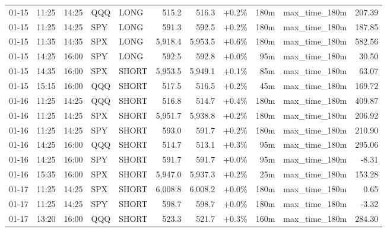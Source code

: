 \documentclass[11pt,a4paper,twoside]{article}
\begin{document}
\begin{center}
\begin{longtable}{>{\color{txtmain}}l l l l l r r r r >{\color{txtmain}}l r}
01-15 & 11:25 & 14:25 & QQQ & LONG & 515.2 & 516.3 & \textcolor{wingreen}{+0.2\%} & 180m & max\_time\_180m & \textcolor{wingreen}{207.39} \\
01-15 & 11:25 & 14:25 & SPY & LONG & 591.3 & 592.5 & \textcolor{wingreen}{+0.2\%} & 180m & max\_time\_180m & \textcolor{wingreen}{187.85} \\
01-15 & 11:35 & 14:35 & SPX & LONG & 5,918.4 & 5,953.5 & \textcolor{wingreen}{+0.6\%} & 180m & max\_time\_180m & \textcolor{wingreen}{582.56} \\
01-15 & 14:25 & 16:00 & SPY & LONG & 592.5 & 592.8 & \textcolor{wingreen}{+0.0\%} & 95m & max\_time\_180m & \textcolor{wingreen}{30.50} \\
01-15 & 14:35 & 16:00 & SPX & SHORT & 5,953.5 & 5,949.1 & \textcolor{wingreen}{+0.1\%} & 85m & max\_time\_180m & \textcolor{wingreen}{63.07} \\
01-15 & 15:15 & 16:00 & QQQ & SHORT & 517.5 & 516.5 & \textcolor{wingreen}{+0.2\%} & 45m & max\_time\_180m & \textcolor{wingreen}{169.72} \\
01-16 & 11:25 & 14:25 & QQQ & SHORT & 516.8 & 514.7 & \textcolor{wingreen}{+0.4\%} & 180m & max\_time\_180m & \textcolor{wingreen}{409.87} \\
01-16 & 11:25 & 14:25 & SPX & SHORT & 5,951.7 & 5,938.8 & \textcolor{wingreen}{+0.2\%} & 180m & max\_time\_180m & \textcolor{wingreen}{206.92} \\
01-16 & 11:25 & 14:25 & SPY & SHORT & 593.0 & 591.7 & \textcolor{wingreen}{+0.2\%} & 180m & max\_time\_180m & \textcolor{wingreen}{210.90} \\
01-16 & 14:25 & 16:00 & QQQ & SHORT & 514.7 & 513.1 & \textcolor{wingreen}{+0.3\%} & 95m & max\_time\_180m & \textcolor{wingreen}{295.06} \\
01-16 & 14:25 & 16:00 & SPY & SHORT & 591.7 & 591.7 & \textcolor{wingreen}{+0.0\%} & 95m & max\_time\_180m & \textcolor{lossred}{-8.31} \\
01-16 & 15:35 & 16:00 & SPX & SHORT & 5,947.0 & 5,937.3 & \textcolor{wingreen}{+0.2\%} & 25m & max\_time\_180m & \textcolor{wingreen}{153.28} \\
01-17 & 11:25 & 14:25 & SPX & SHORT & 6,008.8 & 6,008.2 & \textcolor{wingreen}{+0.0\%} & 180m & max\_time\_180m & \textcolor{wingreen}{0.65} \\
01-17 & 11:25 & 14:25 & SPY & SHORT & 598.7 & 598.7 & \textcolor{wingreen}{+0.0\%} & 180m & max\_time\_180m & \textcolor{lossred}{-3.32} \\
01-17 & 13:20 & 16:00 & QQQ & SHORT & 523.3 & 521.7 & \textcolor{wingreen}{+0.3\%} & 160m & max\_time\_180m & \textcolor{wingreen}{284.30} \\

\end{longtable}
\end{center}
\end{document}
